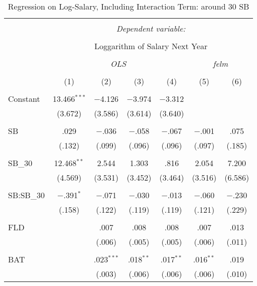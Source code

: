 
\begin{table}[H] \centering
  \caption{Regression on Log-Salary, Including Interaction Term: around 30 SB}
  \label{SB30_A}
\tiny
\begin{tabular}{@{\extracolsep{5pt}}lcccccc}
\\[-1.8ex]\hline
\hline \\[-1.8ex]
 & \multicolumn{6}{c}{\textit{Dependent variable:}} \\
\cline{2-7}
\\[-1.8ex] & \multicolumn{6}{c}{Loggarithm of Salary Next Year} \\
\\[-1.8ex] & \multicolumn{4}{c}{\textit{OLS}} & \multicolumn{2}{c}{\textit{felm}} \\
\\[-1.8ex] & (1) & (2) & (3) & (4) & (5) & (6)\\
\hline \\[-1.8ex]
 Constant & 13.466$^{***}$ & $-$4.126 & $-$3.974 & $-$3.312 &  &  \\
  & (3.672) & (3.586) & (3.614) & (3.640) &  &  \\
  & & & & & & \\
 SB & .029 & $-$.036 & $-$.058 & $-$.067 & $-$.001 & .075 \\
  & (.132) & (.099) & (.096) & (.096) & (.097) & (.185) \\
  & & & & & & \\
 SB\_30 & 12.468$^{**}$ & 2.544 & 1.303 & .816 & 2.054 & 7.200 \\
  & (4.569) & (3.531) & (3.452) & (3.464) & (3.516) & (6.586) \\
  & & & & & & \\
  SB:SB\_30 & $-$.391$^{*}$ & $-$.071 & $-$.030 & $-$.013 & $-$.060 & $-$.230 \\
  & (.158) & (.122) & (.119) & (.119) & (.121) & (.229) \\
  & & & & & & \\
 FLD &  & .007 & .008 & .008 & .007 & .013 \\
  &  & (.006) & (.005) & (.005) & (.006) & (.011) \\
  & & & & & & \\
 BAT &  & .023$^{***}$ & .018$^{**}$ & .017$^{**}$ & .016$^{**}$ & .019 \\
  &  & (.003) & (.006) & (.006) & (.006) & (.010) \\

\end{tabular}
\end{table}
